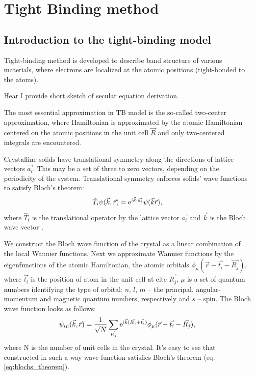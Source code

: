 \chapter{Tight Binding method}
\label{ch:theory}
\section{Introduction to the tight-binding model} \label{sec:TB_theory}
Tight-binding method is developed to describe band structure of various materials, where electrons are localized at the atomic positions (tight-bonded to the atoms). 

Hear I provide short sketch of secular equation derivation.

The most essential approximation in TB model is the so-called two-center approximation, where Hamiltonian is approximated by the atomic Hamiltonian centered on the atomic positions in the unit cell $\vec{R}$ and only two-centered integrals are encountered.

Crystalline solids have translational symmetry along the directions of lattice vectors $\vec{a_i}$. This may be a set of three to zero vectors, depending on the periodicity of the system. Translational symmetry enforces solids' wave functions to satisfy Bloch's theorem:
\begin{equation} \label{eq:blochs_theorem}
	\hat{T}_i \psi(\vec{k},\vec{r}) = \mathrm{e}^{i \vec{k} \cdot \vec{a_i}} \psi(\vec{k}\vec{r}),
\end{equation}
where $\hat{T}_i$ is the translational operator by the lattice vector $\vec{a_i}$ and $\vec{k}$ is the Bloch wave vector \cite{kittel}.

We construct the Bloch wave function of the crystal as a linear combination of the local Wannier functions. Next we approximate Wannier functions by the eigenfunctions of the atomic Hamiltonian, the atomic orbitals $\phi_{\mu}(\vec{r} - \vec{t_i} - \vec{R_j})$, where $\vec{t_i}$ is the position of atom in the unit cell at cite $\vec{R_j}$, $\mu$ is a set of quantum numbers identifying the type of orbital: $n$, $l$, $m$ -- the principal, angular-momentum and magnetic quantum numbers, respectively and $s$ -- spin. The Bloch wave function looks as follows:
\begin{equation} \label{eq:wave_fun}
	\psi_{i \mu}(\vec{k},\vec{r}) = \frac{1}{\sqrt{N}} \sum_{\vec{R_j}} \mathrm{e}^{i\vec{k}(\vec{R_j} + \vec{t_i})} \phi_{\mu} (\vec{r} - \vec{t_i} - \vec{R_j}),
\end{equation}
where N is the number of unit cells in the crystal. It's easy to see that constructed in such a way wave function satisfies Bloch's theorem (eq. \ref{eq:blochs_theorem}).

